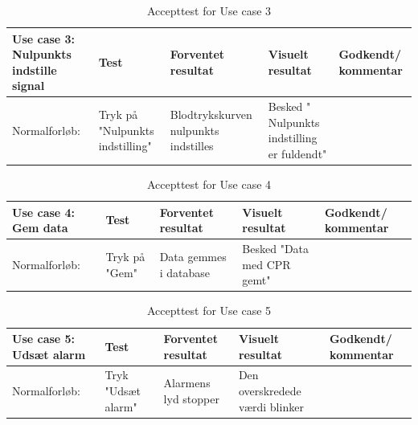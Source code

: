 \begin{table}[h!]
\caption{Accepttest for Use case 3}\label{tab:tabel8}
\begin{tabular}{|>{\raggedright\arraybackslash}p{2.5cm}| >{\raggedright\arraybackslash}p{2.9cm} | >{\raggedright\arraybackslash}p{2.9cm} | >{\raggedright\arraybackslash}p{2.9cm} | >{\raggedright\arraybackslash}p{2.8cm} |}
   \hline
   \textbf{Use case 3: Nulpunkts indstille signal } &\textbf{Test}& \textbf{Forventet resultat} & \textbf{Visuelt resultat} & \textbf{Godkendt/ kommentar}\\ \hline
   Normalforløb:& Tryk på "Nulpunkts indstilling" & Blodtrykskurven nulpunkts indstilles & Besked " Nulpunkts indstilling er fuldendt" &\\\hline
\end{tabular}
\end{table}

\begin{table}[h!]
\caption{Accepttest for Use case 4}\label{tab:tabel8}
\begin{tabular}{|>{\raggedright\arraybackslash}p{2.5cm}| >{\raggedright\arraybackslash}p{2.9cm} | >{\raggedright\arraybackslash}p{2.9cm} | >{\raggedright\arraybackslash}p{2.9cm} | >{\raggedright\arraybackslash}p{2.8cm} |}
   \hline
   \textbf{Use case 4: Gem data } &\textbf{Test}& \textbf{Forventet resultat} & \textbf{Visuelt resultat} & \textbf{Godkendt/ kommentar}\\ \hline
   Normalforløb:& Tryk på "Gem" & Data gemmes i database & Besked "Data med CPR gemt"&\\\hline
\end{tabular}
\end{table}


\begin{table}[h!]
\caption{Accepttest for Use case 5}\label{tab:tabel8}
\begin{tabular}{|>{\raggedright\arraybackslash}p{2.5cm}| >{\raggedright\arraybackslash}p{2.9cm} | >{\raggedright\arraybackslash}p{2.9cm} | >{\raggedright\arraybackslash}p{2.9cm} | >{\raggedright\arraybackslash}p{2.8cm} |}
   \hline
   \textbf{Use case 5: Udsæt alarm } &\textbf{Test}& \textbf{Forventet resultat} & \textbf{Visuelt resultat} & \textbf{Godkendt/ kommentar}\\ \hline
   Normalforløb:& Tryk "Udsæt alarm" & Alarmens lyd stopper & Den overskredede værdi blinker &\\\hline
\end{tabular}
\end{table}



